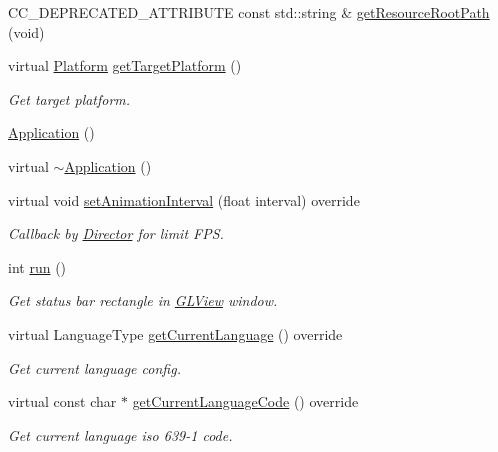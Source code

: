 \begin{DoxyCompactItemize}
C\+C\+\_\+\+D\+E\+P\+R\+E\+C\+A\+T\+E\+D\+\_\+\+A\+T\+T\+R\+I\+B\+U\+TE const std\+::string \& \hyperlink{classApplication_ab0fc99cfeb7f303e68825bde2030ec3e}{get\+Resource\+Root\+Path} (void)
\item 
\mbox{\label{classApplication_ae4024736b5b6baad76953c5e5789f040}} 
virtual \hyperlink{classApplicationProtocol_aff3819b9b879107dc9c207d0e7ae36d1}{Platform} \hyperlink{classApplication_ae4024736b5b6baad76953c5e5789f040}{get\+Target\+Platform} ()
\begin{DoxyCompactList}\small\item\em Get target platform. \end{DoxyCompactList}\item 
\hyperlink{classApplication_afa8cc05ce6b6092be5ecdfdae44e05f8}{Application} ()
\item 
virtual \hyperlink{classApplication_a20573928a0d53fb96d929513bc5acde6}{$\sim$\+Application} ()
\item 
virtual void \hyperlink{classApplication_af04c472d3fac0d922d088896504925ac}{set\+Animation\+Interval} (float interval) override
\begin{DoxyCompactList}\small\item\em Callback by \hyperlink{classDirector}{Director} for limit F\+PS. \end{DoxyCompactList}\item 
int \hyperlink{classApplication_a8cf8941c8db90117d3735bce5ae1fdf4}{run} ()
\begin{DoxyCompactList}\small\item\em Get status bar rectangle in \hyperlink{classGLView}{G\+L\+View} window. \end{DoxyCompactList}\item 
virtual Language\+Type \hyperlink{classApplication_ac972f15de44614b03604fb4e3e05cab3}{get\+Current\+Language} () override
\begin{DoxyCompactList}\small\item\em Get current language config. \end{DoxyCompactList}\item 
virtual const char $\ast$ \hyperlink{classApplication_a47bfc4cd5a784ce46bd05e727b2e8781}{get\+Current\+Language\+Code} () override
\begin{DoxyCompactList}\small\item\em Get current language iso 639-\/1 code. \end{DoxyCompactList}\item 

\end{DoxyCompactItemize}
